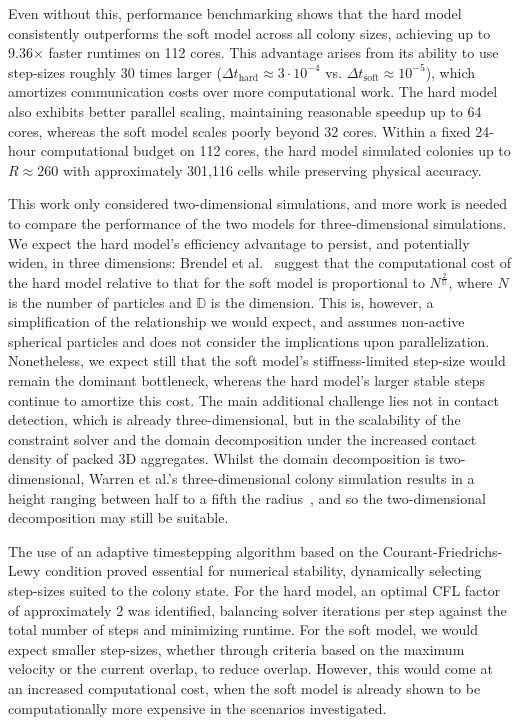 \documentclass[a4paper,fleqn]{cas-dc}
\begin{document}
Even without this, performance benchmarking shows that the hard model consistently outperforms the soft model across all colony sizes, achieving up to 9.36$\times$ faster runtimes on 112 cores. This advantage arises from its ability to use step-sizes roughly 30 times larger ($\Delta t_{\text{hard}} \approx 3 \cdot 10^{-4}$ vs. $\Delta t_{\text{soft}} \approx 10^{-5}$), which amortizes communication costs over more computational work. The hard model also exhibits better parallel scaling, maintaining reasonable speedup up to 64 cores, whereas the soft model scales poorly beyond 32 cores. Within a fixed 24-hour computational budget on 112 cores, the hard model simulated colonies up to $R \approx 260$ with approximately 301,116 cells while preserving physical accuracy.

This work only considered two-dimensional simulations, and more work is needed to compare the performance of the two models for three-dimensional simulations. We expect the hard model's efficiency advantage to persist, and potentially widen, in three dimensions: Brendel et al.~\cite{doi:https://doi.org/10.1002/352760362X.ch14} suggest that the computational cost of the hard model relative to that for the soft model is proportional to $N^\frac{2}{\mathbb{D}}$, where $N$ is the number of particles and $\mathbb{D}$ is the dimension. This is, however, a simplification of the relationship we would expect, and assumes non-active spherical particles and does not consider the implications upon parallelization. Nonetheless, we expect still that the soft model's stiffness-limited step-size would remain the dominant bottleneck, whereas the hard model's larger stable steps continue to amortize this cost. The main additional challenge lies not in contact detection, which is already three-dimensional, but in the scalability of the constraint solver and the domain decomposition under the increased contact density of packed 3D aggregates. Whilst the domain decomposition is two-dimensional, Warren et al.'s three-dimensional colony simulation results in a height ranging between half to a fifth the radius~\cite{Warren2019}, and so the two-dimensional decomposition may still be suitable.

The use of an adaptive timestepping algorithm based on the Courant-Friedrichs-Lewy condition proved essential for numerical stability, dynamically selecting step-sizes suited to the colony state. For the hard model, an optimal CFL factor of approximately 2 was identified, balancing solver iterations per step against the total number of steps and minimizing runtime. For the soft model, we would expect smaller step-sizes, whether through criteria based on the maximum velocity or the current overlap, to reduce overlap. However, this would come at an increased computational cost, when the soft model is already shown to be computationally more expensive in the scenarios investigated.
\end{document}
